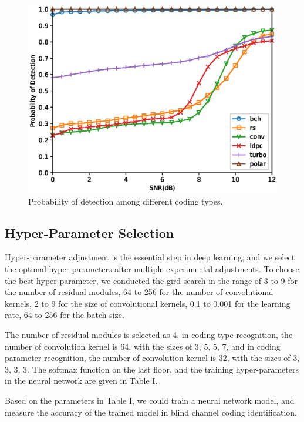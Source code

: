 \documentclass[conference]{IEEEtran}
\begin{document}
\begin{figure}[tbp]
	\centerline{\includegraphics[scale=0.6]{result-type.eps}}
	\caption{Probability of detection among different coding types.}%
\end{figure}

\subsection{Hyper-Parameter Selection}
Hyper-parameter adjustment is the essential step in deep learning, and we select the optimal hyper-parameters after multiple experimental adjustments. To choose the best hyper-parameter, we conducted the gird search in the range of 3 to 9 for the number of residual modules, 64 to 256 for the number of convolutional kernels, 2 to 9 for the size of convolutional kernels, 0.1 to 0.001 for the learning rate, 64 to 256 for the batch size.

The number of residual modules is selected as 4, in coding type recognition, the number of convolution kernel is 64, with the sizes of 3, 5, 5, 7, and in coding parameter recognition,  the number of convolution kernel is 32, with the sizes of 3, 3, 3, 3. The softmax function on the last floor, and the training hyper-parameters in the neural network are given in Table I.

Based on the parameters in Table I, we could train a neural network model, and measure the accuracy of the trained model in blind channel coding identification. 
\end{document}
